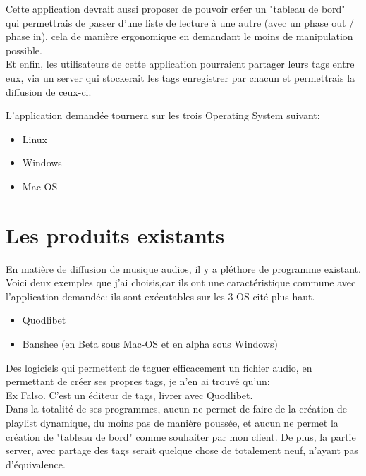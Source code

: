 \documentclass[a4paper,12pt]{report}
\begin{document}
Cette application devrait aussi proposer de pouvoir créer un "tableau de bord" qui permettrais de passer d'une liste de lecture à une autre (avec un phase out / phase in), cela de manière ergonomique en demandant le moins de manipulation possible.\\

Et enfin, les utilisateurs de cette application pourraient partager leurs tags entre eux, via un server qui stockerait les tags enregistrer par chacun et permettrais la diffusion de ceux-ci.

L'application demandée tournera sur les trois Operating System suivant:\\

\begin{itemize}
\item Linux
\item Windows
\item Mac-OS
\end{itemize}

\section{Les produits existants}

En matière de diffusion de musique audios, il y a pléthore de programme existant.
Voici deux exemples que j'ai choisis,car ils ont une caractéristique commune avec l'application demandée: ils sont exécutables sur les 3 OS cité plus haut. \\

\begin{itemize}
\item Quodlibet
\item Banshee (en Beta sous Mac-OS et en alpha sous Windows)
\end{itemize}

Des logiciels qui permettent de taguer efficacement un fichier audio, en permettant de créer ses propres tags, je n'en ai trouvé qu'un:\\

Ex Falso.
C'est un éditeur de tags, livrer avec Quodlibet.\\

Dans la totalité de ses programmes, aucun ne permet de faire de la création de playlist dynamique, du moins pas de manière poussée, et aucun ne permet la création de "tableau de bord" comme souhaiter par mon client.
De plus, la partie server, avec partage des tags serait quelque chose de totalement neuf, n'ayant pas d'équivalence.
\end{document}
